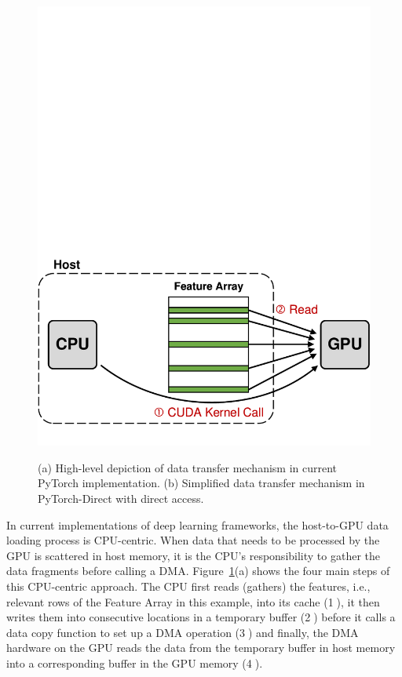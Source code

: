 \begin{figure}[!htbp]
[\linewidth]{\includegraphics[scale=0.55]{figures/PyDArXiv/design_comparison_pytorch_direct.pdf}}
\caption{\label{fig:design_comparison} (a) High-level depiction of data transfer mechanism in current PyTorch implementation. (b) Simplified data transfer mechanism in PyTorch-Direct with direct access.}
\end{figure}




In current implementations of deep learning frameworks, the host-to-GPU data loading process is CPU-centric.
When data that needs to be processed by the GPU is scattered in host memory, it is the CPU's responsibility to gather the data fragments before calling a DMA.  Figure~\ref{fig:design_comparison}(a) shows the four main steps of this CPU-centric approach. The CPU first reads (gathers) the features, i.e., relevant rows of the Feature Array in this example, into its cache (\textcircled{1}),
it then writes them into consecutive locations in a temporary buffer (\textcircled{2}) 
before it calls a data copy function to set up a DMA operation (\textcircled{3}) 
and finally, the DMA hardware on the GPU reads the data from the temporary buffer in host memory into a corresponding buffer in the GPU memory (\textcircled{4}).



